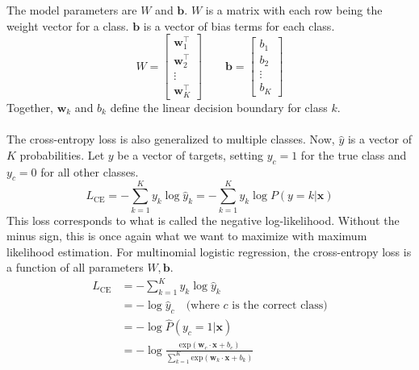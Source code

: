 \documentclass[11pt]{article}
\begin{document}
The model parameters are $W$ and $\mathbf{b}$. $W$ is a matrix with each row being the weight vector for a class. $\mathbf{b}$ is a vector of bias terms for each class.
$$
W=\begin{bmatrix}
    \mathbf{w}_1^{\top} \\
    \mathbf{w}_2^{\top} \\
    \vdots \\
    \mathbf{w}_K^{\top}
\end{bmatrix}
\quad\quad
\mathbf{b}=\begin{bmatrix}
    b_1 \\
    b_2 \\
    \vdots \\
    b_K
\end{bmatrix}
$$
Together, $\mathbf{w}_k$ and $b_k$ define the linear decision boundary for class $k$. \\\\
The cross-entropy loss is also generalized to multiple classes. Now, $\hat{y}$ is a vector of $K$ probabilities. Let $y$ be a vector of targets, setting $y_c=1$ for the true class and $y_c=0$ for all other classes.
$$
L_{\text{CE}}=-\sum_{k=1}^{K}y_k\log\hat{y}_k=-\sum_{k=1}^{K}y_k\log P(y=k|\mathbf{x})
$$
This loss corresponds to what is called the negative log-likelihood. Without the minus sign, this is once again what we want to maximize with maximum likelihood estimation.
For multinomial logistic regression, the cross-entropy loss is a function of all parameters $W,\mathbf{b}$.
\begin{align*}
    L_{\text{CE}}&=-\sum_{k=1}^{K}y_k\log\hat{y}_k \\
    &=-\log\hat{y}_c\quad\text{(where }c\text{ is the correct class)} \\
    &=-\log\hat{P}(y_c=1|\mathbf{x}) \\
    &=-\log\frac{\text{exp}(\mathbf{w}_c\cdot\mathbf{x}+b_c)}{\sum_{k=1}^{K}\text{exp}(\mathbf{w}_k\cdot\mathbf{x}+b_k)}
\end{align*}
\end{document}
